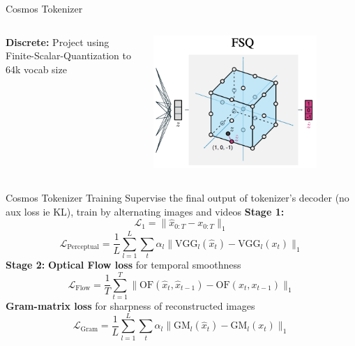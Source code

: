 \documentclass{beamer}
\begin{document}
\begin{frame}[t]{Cosmos Tokenizer}
\begin{columns}[t]
\begin{column}{.6\textwidth}
            \textbf{Discrete:} \newline
            \hspace{+4em}Project using Finite-Scalar-Quantization to 64k vocab size
		\end{column}
		\begin{column}{.4\textwidth}
            \begin{center}
                \includegraphics[width=0.8\textwidth]{./img/fsq.png}
            \end{center}
		\end{column}
	\end{columns}
\end{frame}

\begin{frame}[t]{Cosmos Tokenizer Training}
    Supervise the final output of tokenizer's decoder (no aux loss ie KL), train by alternating images and videos \newline
    \textbf{Stage 1:}
    \[\mathcal{L}_1 = \| \hat{x}_{0:T} - x_{0:T} \|_1\]
    \[\mathcal{L}_{\text{Perceptual}} = \frac{1}{L} \sum_{l=1}^{L} \sum_{t} \alpha_l \| \text{VGG}_l(\hat{x}_t) - \text{VGG}_l(x_t) \|_1\]
    \textbf{Stage 2:} \newline
    \textbf{Optical Flow loss} for temporal smoothness
    \[\mathcal{L}_{\text{Flow}} = \frac{1}{T} \sum_{t=1}^{T} \| \text{OF}(\hat{x}_t, \hat{x}_{t-1}) - \text{OF}(x_t, x_{t-1}) \|_1\]    
    \textbf{Gram-matrix loss} for sharpness of reconstructed images
    \[\mathcal{L}_{\text{Gram}} = \frac{1}{L} \sum_{l=1}^{L} \sum_{t} \alpha_l \| \text{GM}_l(\hat{x}_t) - \text{GM}_l(x_t) \|_1\]
\end{frame}
\end{document}
